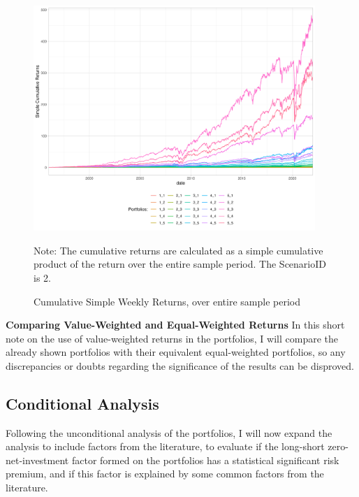 \begin{figure}
	\centering
	\caption[Cumulative Weekly Returns]{Cumulative Simple Weekly Returns, over entire sample period}
	
	\includegraphics[width=0.95\textwidth]{./Plots/cumulativereturns_entireperiod_simple_2.png}
	\label{fig:cumula_returns_2}
	
	{\small Note: The cumulative returns are calculated as a simple cumulative product of the return over the entire sample period. The ScenarioID is 2.}
	
\end{figure}

\textbf{Comparing Value-Weighted and Equal-Weighted Returns} In this short note on the use of value-weighted returns in the portfolios, I will compare the already shown portfolios with their equivalent equal-weighted portfolios, so any discrepancies or doubts regarding the significance of the results can be disproved.




\subsection{Conditional Analysis}

Following the unconditional analysis of the portfolios, I will now expand the analysis to include factors from the literature, to evaluate if the long-short zero-net-investment factor formed on the portfolios has a statistical significant risk premium, and if this factor is explained by some common factors from the literature. 

